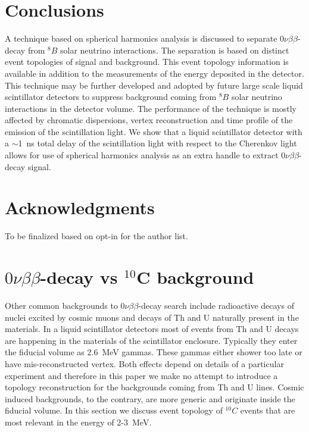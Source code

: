 \documentclass[12pt,twoside,letterpaper]{article}
\newcommand{\vbb}{0\nu\beta\beta}
\newcommand{\B}{^{8}B}
\newcommand{\Cten}{^{10}C}
\begin{document}
\section{Conclusions}
A technique based on spherical harmonics analysis is discussed to separate $\vbb$-decay from $\B$ solar neutrino interactions. The separation is based on distinct event topologies of signal and background. This event topology information is available in addition to the measurements of the energy deposited in the detector. This technique may be further developed and adopted by future large scale liquid scintillator detectors to suppress background coming from $\B$ solar neutrino interactions in the detector volume. The performance of the technique is mostly affected by chromatic dispersions, vertex reconstruction and time profile of the emission of the scintillation light. We show that a liquid scintillator detector with a $\sim$1~ns total delay of the scintillation light with respect to the Cherenkov light allows for use of spherical harmonics analysis as an extra handle to extract $\vbb$-decay signal.


\section{Acknowledgments}
To be finalized based on opt-in for the author list.


\appendix

\section{$\vbb$-decay vs $^{10}$C background}

Other common backgrounds to $\vbb$-decay search include radioactive decays of nuclei excited by cosmic muons and decays of Th and U naturally present in the materials. In a liquid scintillator detectors most of events from Th and U decays are happening in the materials of the scintillator enclosure. Typically they enter the fiducial volume as 2.6~MeV gammas. These gammas either shower too late or have mis-reconstructed vertex. Both effects depend on details of a particular experiment and therefore in this paper we make no attempt to introduce a topology reconstruction for the backgrounds coming from Th and U lines. Cosmic induced backgrounds, to the contrary, are more generic and originate inside the fiducial volume. In this section we discuss event topology of $\Cten$ events that are most relevant in the energy of 2-3~MeV.
\end{document}

